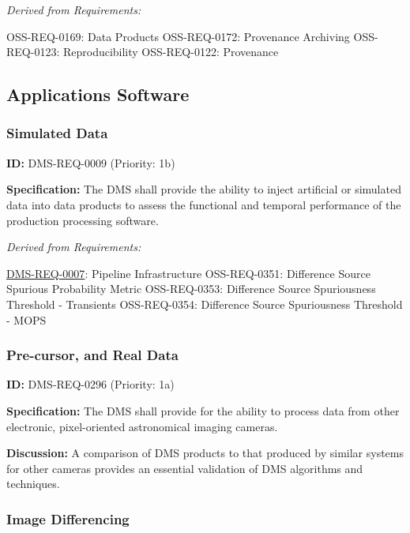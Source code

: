 \documentclass[SE,toc,lsstdraft]{lsstdoc}
\begin{document}
\emph{Derived from Requirements:}

OSS-REQ-0169:
Data Products \newline
OSS-REQ-0172:
Provenance Archiving \newline
OSS-REQ-0123:
Reproducibility \newline
OSS-REQ-0122:
Provenance \newline

\subsection{Applications Software}

\subsubsection{Simulated Data}

\label{DMS-REQ-0009}
\textbf{ID:} DMS-REQ-0009 (Priority: 1b)

\textbf{Specification:} The DMS shall provide the ability to inject artificial or simulated data into data products to assess the functional and temporal performance of the production processing software.

\emph{Derived from Requirements:}

\hyperref[DMS-REQ-0007]{DMS-REQ-0007}:
Pipeline Infrastructure \newline
OSS-REQ-0351:
Difference Source Spurious Probability Metric \newline
OSS-REQ-0353:
Difference Source Spuriousness Threshold - Transients \newline
OSS-REQ-0354:
Difference Source Spuriousness Threshold - MOPS \newline

\subsubsection{Pre-cursor, and Real Data}

\label{DMS-REQ-0296}
\textbf{ID:} DMS-REQ-0296 (Priority: 1a)

\textbf{Specification:} The DMS shall provide for the ability to process data from other electronic, pixel-oriented astronomical imaging cameras.

\textbf{Discussion: }A comparison of DMS products to that produced by similar systems for other cameras provides an essential validation of DMS algorithms and techniques.

\subsubsection{Image Differencing}
\end{document}
